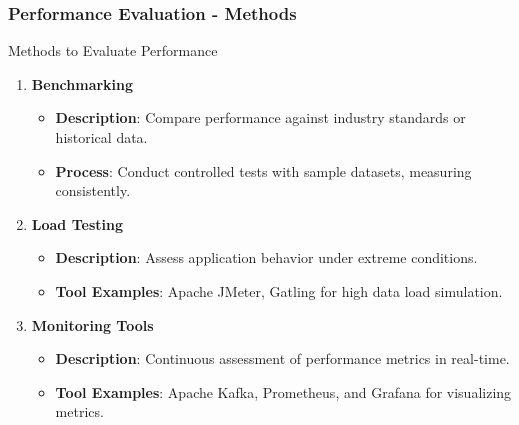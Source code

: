 \documentclass[aspectratio=169]{beamer}
\begin{document}
\begin{frame}[fragile]
    \frametitle{Performance Evaluation - Methods}
    \begin{block}{Methods to Evaluate Performance}
        \begin{enumerate}
            \item \textbf{Benchmarking}
                \begin{itemize}
                    \item \textbf{Description}: Compare performance against industry standards or historical data.
                    \item \textbf{Process}: Conduct controlled tests with sample datasets, measuring consistently.
                \end{itemize}
            \item \textbf{Load Testing}
                \begin{itemize}
                    \item \textbf{Description}: Assess application behavior under extreme conditions.
                    \item \textbf{Tool Examples}: Apache JMeter, Gatling for high data load simulation.
                \end{itemize}
            \item \textbf{Monitoring Tools}
                \begin{itemize}
                    \item \textbf{Description}: Continuous assessment of performance metrics in real-time.
                    \item \textbf{Tool Examples}: Apache Kafka, Prometheus, and Grafana for visualizing metrics.
                \end{itemize}
        \end{enumerate}
    \end{block}
\end{frame}
\end{document}
